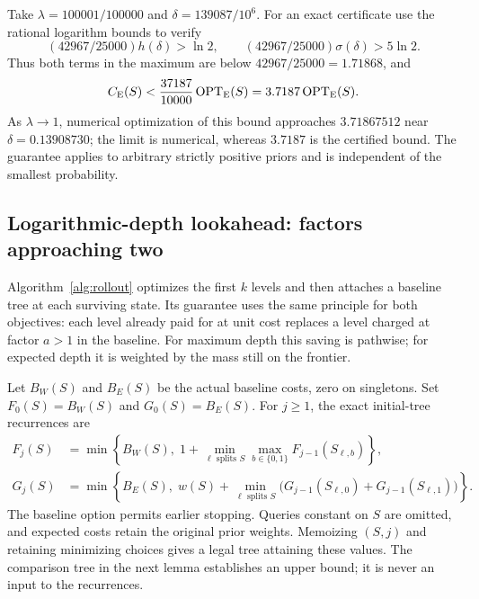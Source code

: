 Take $\lambda=100001/100000$ and $\delta=139087/10^6$. For an exact
certificate use the rational logarithm bounds to verify
\[
 (42967/25000)h(\delta)>\ln2,\qquad
 (42967/25000)\sigma(\delta)>5\ln2.
\]
Thus both terms in the maximum are below $42967/25000=1.71868$, and
\begin{equation}\label{thm:qp-expected}
 C_{\mathrm E}(S)<\frac{37187}{10000}\operatorname{OPT}_{\mathrm E}(S)
 =3.7187\operatorname{OPT}_{\mathrm E}(S).
\end{equation}
As $\lambda\to1$, numerical optimization of this bound approaches
$3.71867512$ near $\delta=0.13908730$; the limit is numerical,
whereas $3.7187$ is the certified bound. The guarantee applies to
arbitrary strictly positive priors and is independent of the smallest
probability.

\subsection{Logarithmic-depth lookahead: factors approaching two}

Algorithm~\ref{alg:rollout} optimizes the first $k$ levels and then
attaches a baseline tree at each surviving state. Its guarantee uses
the same principle for both objectives: each level already paid for
at unit cost replaces a level charged at factor $a>1$ in the baseline.
For maximum depth this saving is pathwise; for expected depth it is
weighted by the mass still on the frontier.

Let $B_W(S)$ and $B_E(S)$ be the actual baseline costs, zero on
singletons. Set $F_0(S)=B_W(S)$ and $G_0(S)=B_E(S)$. For $j\ge1$,
the exact initial-tree recurrences are
\begin{align*}
 F_j(S)&=\min\left\{B_W(S),\;
 1+\min_{\ell\text{ splits }S}\max_{b\in\{0,1\}}F_{j-1}(S_{\ell,b})
 \right\},\\
 G_j(S)&=\min\left\{B_E(S),\;
 w(S)+\min_{\ell\text{ splits }S}
 \bigl(G_{j-1}(S_{\ell,0})+G_{j-1}(S_{\ell,1})\bigr)\right\}.
\end{align*}
The baseline option permits earlier stopping. Queries constant on
$S$ are omitted, and expected costs retain the original prior
weights. Memoizing $(S,j)$ and retaining minimizing choices gives
a legal tree attaining these values. The comparison tree in the
next lemma establishes an upper bound; it is never an input to the
recurrences.

